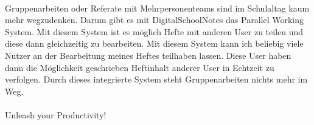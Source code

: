 \\
Gruppenarbeiten oder Referate mit Mehrpersonenteams sind im Schulaltag kaum mehr wegzudenken. Darum gibt es mit DigitalSchoolNotes das Parallel Working System. Mit diesem System ist es möglich Hefte mit anderen User zu teilen und diese dann gleichzeitig zu bearbeiten. Mit diesem System kann ich beliebig viele Nutzer an der Bearbeitung meines Heftes teilhaben lassen. Diese User haben dann die Möglichkeit geschrieben Heftinhalt anderer User in Echtzeit zu verfolgen. Durch dieses integrierte System steht Gruppenarbeiten nichts mehr im Weg.\\
\\
Unleash your Productivity!

